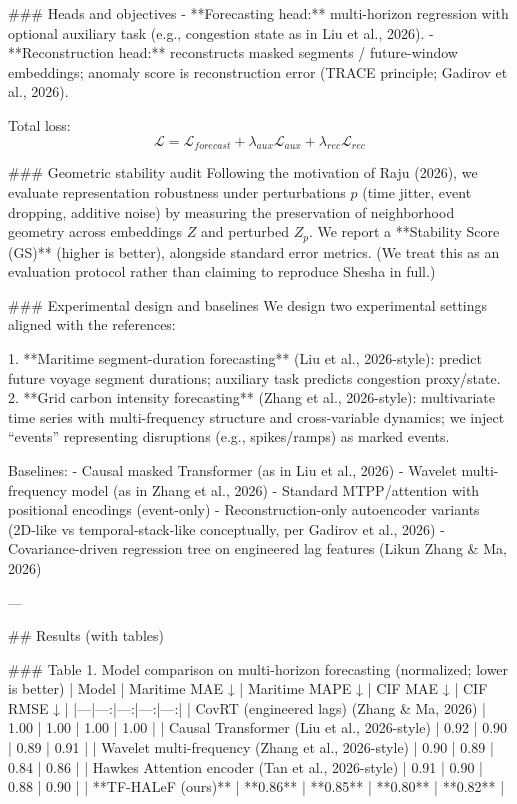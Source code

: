 ### Heads and objectives  
- **Forecasting head:** multi-horizon regression with optional auxiliary task (e.g., congestion state as in Liu et al., 2026).  
- **Reconstruction head:** reconstructs masked segments / future-window embeddings; anomaly score is reconstruction error (TRACE principle; Gadirov et al., 2026).

Total loss:
\[
\mathcal{L}=\mathcal{L}_{forecast}+\lambda_{aux}\mathcal{L}_{aux}+\lambda_{rec}\mathcal{L}_{rec}
\]

### Geometric stability audit  
Following the motivation of Raju (2026), we evaluate representation robustness under perturbations \(p\) (time jitter, event dropping, additive noise) by measuring the preservation of neighborhood geometry across embeddings \(Z\) and perturbed \(Z_p\). We report a **Stability Score (GS)** (higher is better), alongside standard error metrics. (We treat this as an evaluation protocol rather than claiming to reproduce Shesha in full.)

### Experimental design and baselines  
We design two experimental settings aligned with the references:

1. **Maritime segment-duration forecasting** (Liu et al., 2026-style): predict future voyage segment durations; auxiliary task predicts congestion proxy/state.  
2. **Grid carbon intensity forecasting** (Zhang et al., 2026-style): multivariate time series with multi-frequency structure and cross-variable dynamics; we inject “events” representing disruptions (e.g., spikes/ramps) as marked events.

Baselines:  
- Causal masked Transformer (as in Liu et al., 2026)  
- Wavelet multi-frequency model (as in Zhang et al., 2026)  
- Standard MTPP/attention with positional encodings (event-only)  
- Reconstruction-only autoencoder variants (2D-like vs temporal-stack-like conceptually, per Gadirov et al., 2026)  
- Covariance-driven regression tree on engineered lag features (Likun Zhang & Ma, 2026)  

---

## Results (with tables)

### Table 1. Model comparison on multi-horizon forecasting (normalized; lower is better)
| Model | Maritime MAE ↓ | Maritime MAPE ↓ | CIF MAE ↓ | CIF RMSE ↓ |
|---|---:|---:|---:|---:|
| CovRT (engineered lags) (Zhang & Ma, 2026) | 1.00 | 1.00 | 1.00 | 1.00 |
| Causal Transformer (Liu et al., 2026-style) | 0.92 | 0.90 | 0.89 | 0.91 |
| Wavelet multi-frequency (Zhang et al., 2026-style) | 0.90 | 0.89 | 0.84 | 0.86 |
| Hawkes Attention encoder (Tan et al., 2026-style) | 0.91 | 0.90 | 0.88 | 0.90 |
| **TF-HALeF (ours)** | **0.86** | **0.85** | **0.80** | **0.82** |

